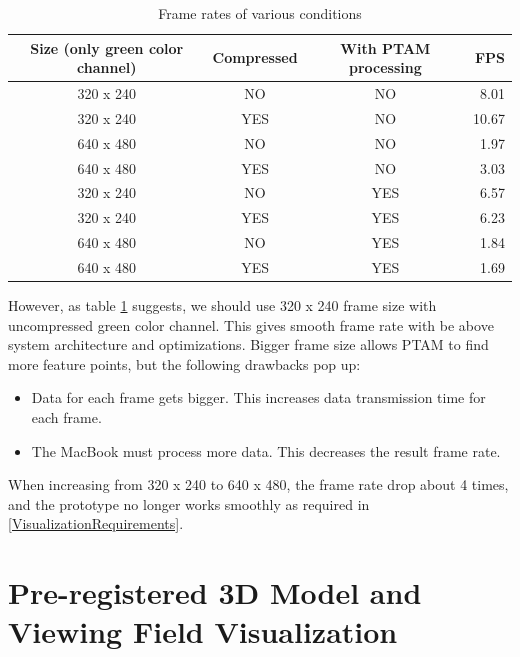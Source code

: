 \begin{table}[tb]
	\begin{center}
		\caption{Frame rates of various conditions}
		\label{tb:FrameRates}
		\begin{tabular}{|c|c|c|r|}
			\hline
			Size (only green color channel) & Compressed & With PTAM processing & FPS   \\
			\hline
			320 x 240 & NO         & NO                   &  8.01 \\
			320 x 240 & YES        & NO                   & 10.67 \\
			640 x 480 & NO         & NO                   &  1.97 \\
			640 x 480 & YES        & NO                   &  3.03 \\
			320 x 240 & NO         & YES                  &  6.57 \\
			320 x 240 & YES        & YES                  &  6.23 \\
			640 x 480 & NO         & YES                  &  1.84 \\
			640 x 480 & YES        & YES                  &  1.69 \\
			\hline
		\end{tabular}
	\end{center}
\end{table}

However, as table \ref{tb:FrameRates} suggests, we should use 320 x 240 frame size with uncompressed green color channel. This gives smooth frame rate with be above system architecture and optimizations. Bigger frame size allows PTAM to find more feature points, but the following drawbacks pop up:

\begin{itemize}
	\item Data for each frame gets bigger. This increases data transmission time for each frame.
	\item The MacBook must process more data. This decreases the result frame rate.
\end{itemize}

When increasing from 320 x 240 to 640 x 480, the frame rate drop about 4 times, and the prototype no longer works smoothly as required in \ref{VisualizationRequirements}.


\section{Pre-registered 3D Model and Viewing Field Visualization}
\label{3DModel}

